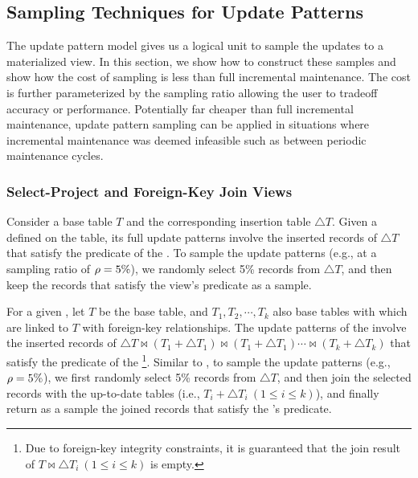 \subsection{Sampling Techniques for Update Patterns}\label{subsec:sample-pattern}
The update pattern model gives us a logical unit to sample the updates to a materialized view.
In this section, we show how to construct these samples and show how the cost of sampling is less than full incremental maintenance.
The cost is further parameterized by the sampling ratio allowing the user to tradeoff accuracy or performance.
Potentially far cheaper than full incremental maintenance, update pattern sampling can be applied in situations where incremental maintenance was deemed infeasible such as between periodic maintenance cycles.

\subsubsection{Select-Project and Foreign-Key Join Views}
Consider a base table $T$ and the corresponding insertion table $\triangle T$. Given a \spview defined on the table, its full update patterns involve the inserted records of $\triangle T$ that satisfy the predicate of the \spview. To sample the update patterns (e.g., at a sampling ratio of $\rho  = 5 \%$), we randomly select 5\% records from $\triangle T$, and then keep the records that satisfy the view's predicate as a sample. 

\sloppy

For a given \fjview, let $T$ be the base table, and $T_1, T_2, \cdots, T_k$ also base tables with which are linked to $T$ with foreign-key relationships. The update patterns of the \fjview involve the inserted records of $\triangle T \bowtie (T_1+\triangle T_1) \bowtie (T_1+\triangle T_1) \cdots \bowtie (T_k+\triangle T_k)$ that satisfy the predicate of the \fjview\footnote{Due to foreign-key integrity constraints, it is guaranteed that the join result of $T \bowtie \triangle T_i ~(1\leq i \leq k)$ is empty.}. Similar to \spview, to sample the update patterns (e.g., $\rho = 5 \%$), we first randomly select 5\% records from $\triangle T$, and then join the selected records with the up-to-date tables (i.e., $T_i + \triangle T_i ~(1\leq i \leq k)$), and finally return as a sample the joined records that satisfy the \fjview's predicate. 

\fussy



\vspace{.5em}


